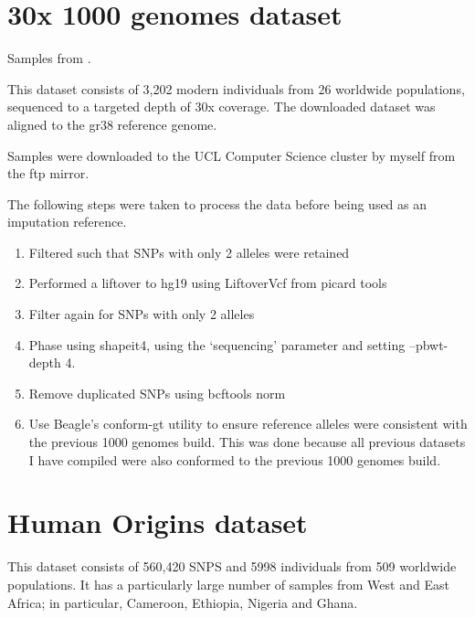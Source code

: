 \section{30x 1000 genomes dataset} \label{1000genomesdataset}

Samples from \cite{byrska2021high}.

This dataset consists of 3,202 modern individuals from 26 worldwide populations, sequenced to a targeted depth of 30x coverage. The downloaded dataset was aligned to the gr38 reference genome.

Samples were downloaded to the UCL Computer Science cluster by myself from the ftp mirror.

The following steps were taken to process the data before being used as an imputation reference. 

\begin{enumerate}
\item Filtered such that SNPs with only 2 alleles were retained
\item Performed a liftover to hg19 using LiftoverVcf from picard tools \cite{Picard2018toolkit}
\item Filter again for SNPs with only 2 alleles
\item Phase using shapeit4, using the `sequencing' parameter and setting --pbwt-depth 4.
\item Remove duplicated SNPs using bcftools norm \cite{li2009sequence} 
\item Use Beagle's conform-gt utility to ensure reference alleles were consistent with the previous 1000 genomes build. This was done because all previous datasets I have compiled were also conformed to the previous 1000 genomes build. 
\end{enumerate}

\section{Human Origins dataset} \label{HumanOriginsAppendix}

This dataset consists of 560,420 SNPS and 5998 individuals from 509 worldwide populations. It has a particularly large number of samples from West and East Africa; in particular, Cameroon, Ethiopia, Nigeria and Ghana. 

\begingroup\fontsize{8}{10}\selectfont

